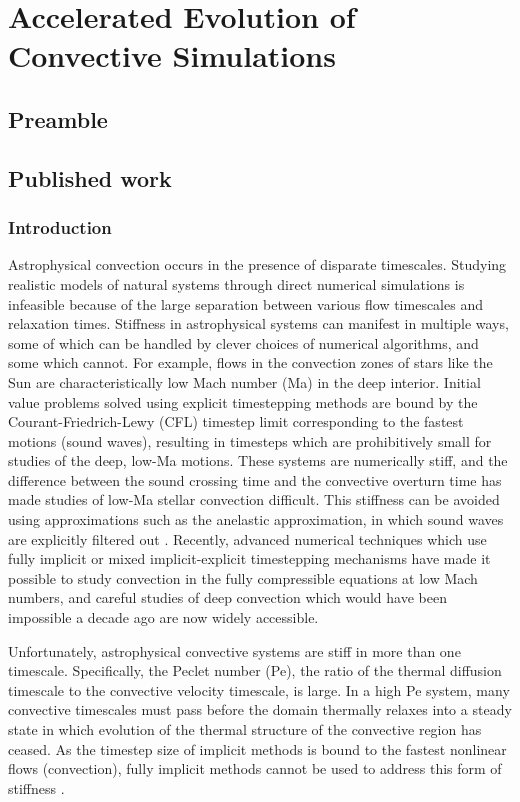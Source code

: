 \chapter{Accelerated Evolution of Convective Simulations}
\label{ch:abo18}

\section{Preamble}

\section{Published work}

\subsection{Introduction}
\label{sec:intro}
Astrophysical convection occurs in the presence of disparate timescales. 
Studying realistic models of natural systems through direct numerical
simulations is infeasible because of the
large separation between various flow timescales and relaxation times.
Stiffness in astrophysical systems can manifest in multiple ways, some of which can
be handled by clever choices of numerical algorithms, and some which cannot.
For example,
flows in the convection zones of stars like the Sun are characteristically low Mach number
(Ma) in the deep interior. Initial value problems solved using
explicit timestepping methods are bound by the Courant-Friedrich-Lewy
(CFL) timestep limit corresponding to the fastest motions (sound
waves), resulting in timesteps which are prohibitively
small for studies of the deep, low-Ma motions. These systems are numerically
stiff, and the difference between
the sound crossing time and the convective overturn time has made studies of low-Ma stellar
convection difficult. This stiffness can be avoided using approximations such as
the anelastic approximation, in which sound waves are explicitly filtered out
\cite{brown&all2010, featherstone&hindman2016}.
Recently, advanced numerical techniques which use fully implicit 
\cite{viallet&all2011, viallet&all2013, viallet&all2016} or mixed
implicit-explicit \cite{lecoanet&all2014, anders&brown2017, bordwell&all2018} 
timestepping mechanisms have made it possible to study
convection in the fully compressible equations at low Mach numbers, 
and careful studies of deep convection which
would have been impossible a decade ago are now widely accessible.

Unfortunately, astrophysical convective systems are stiff in more than one 
timescale. Specifically, the Peclet number (Pe), the ratio of the thermal
diffusion timescale to the convective velocity timescale, is large.
In a high Pe system, many convective timescales must pass before 
the domain thermally relaxes into a steady state in which
evolution of the thermal structure of the convective region has ceased.
As the timestep size of implicit methods is bound to the fastest nonlinear flows
(convection), fully implicit methods cannot be used to address this form of stiffness
\cite{viallet&all2011, viallet&all2013, viallet&all2016}. 

